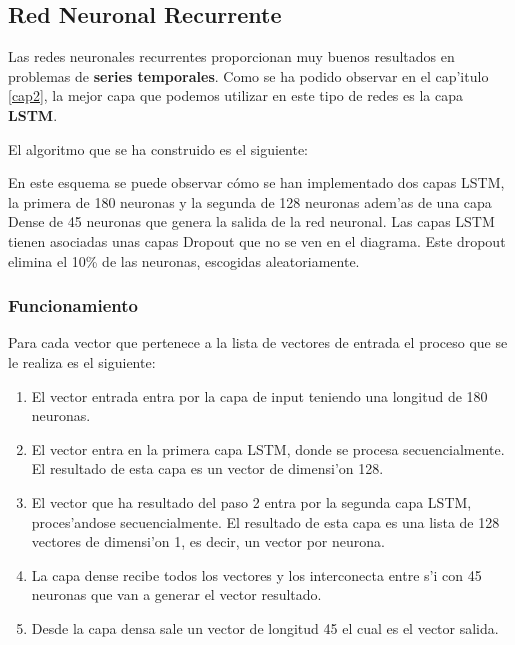 \clearpage

\subsection{Red Neuronal Recurrente}

Las redes neuronales recurrentes proporcionan muy buenos resultados en problemas de \textbf{series temporales}. Como se ha podido observar en el cap'itulo \ref{cap2}, la mejor capa que podemos utilizar en este tipo de redes es la capa \textbf{LSTM}.

El algoritmo que se ha construido es el siguiente:


En este esquema se puede observar cómo se han implementado dos capas LSTM, la primera de 180 neuronas y la segunda de 128 neuronas adem'as de una capa Dense de 45 neuronas que genera la salida de la red neuronal. Las capas LSTM tienen asociadas unas capas Dropout que no se ven en el diagrama. Este dropout elimina el 10\% de las neuronas, escogidas aleatoriamente.

\subsubsection*{Funcionamiento}

Para cada vector que pertenece a la lista de vectores de entrada el proceso que se le realiza es el siguiente:

\begin{enumerate}
\item El vector entrada entra por la capa de input teniendo una longitud de 180 neuronas.
\item El vector entra en la primera capa LSTM, donde se procesa secuencialmente. El resultado de esta capa es un vector de dimensi'on 128. 
\item El vector que ha resultado del paso 2 entra por la segunda capa LSTM, proces'andose secuencialmente. El resultado de esta capa es una lista de 128 vectores de dimensi'on 1, es decir, un vector por neurona.
\item La capa dense recibe todos los vectores y los interconecta entre s'i con 45 neuronas que van a generar el vector resultado.
\item Desde la capa densa sale un vector de longitud 45 el cual es el vector salida.
\end{enumerate}


